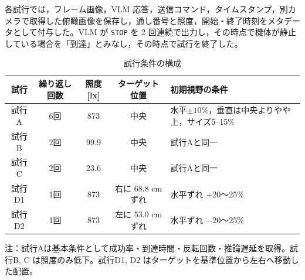 \documentclass[a4paper,11pt]{ltjsreport}
\begin{document}
各試行では，フレーム画像，VLM 応答，送信コマンド，タイムスタンプ，別カメラで取得した俯瞰画像を保存し，通し番号と照度，開始・終了時刻をメタデータとして付与した。VLM が \texttt{STOP} を 2 回連続で出力し，その時点で機体が静止している場合を「到達」とみなし，その時点で試行を終了した。

\begin{table}[htbp]
  \centering
  \caption{試行条件の構成}
  \label{tab:runs}
  \footnotesize
  \setlength{\tabcolsep}{3pt}
  \setlength{\arrayrulewidth}{0.5pt}
  \renewcommand{\arraystretch}{1.1}
  \begin{tabularx}{\textwidth}{|c|c|c|c|Y|}
    \hline
    試行 & 繰り返し回数 & 照度 [lx] & ターゲット位置 & 初期視野の条件 \\
    \hline
    試行A & 6回   & 873   & 中央 & 水平$\pm 10\%$，垂直は中央よりやや上，サイズ5--15\% \\
    試行B & 2回   & 99.9  & 中央 & 試行Aと同一 \\
    試行C & 2回   & 23.6  & 中央 & 試行Aと同一 \\
    試行D1 & 1回   & 873   & 右に 68.8 cm ずれ & 水平ずれ +20〜25\% \\
    試行D2 & 1回   & 873   & 左に 53.0 cm ずれ & 水平ずれ −20〜25\% \\
    \hline
  \end{tabularx}
  \vspace{1mm}
  \begin{flushleft}
    \footnotesize
    注：試行Aは基本条件として成功率・到達時間・反転回数・推論遅延を取得。試行B, C は照度のみ低下。試行D1, D2 はターゲットを基準位置から左右へ移動した配置。
  \end{flushleft}
\end{table}
\end{document}
